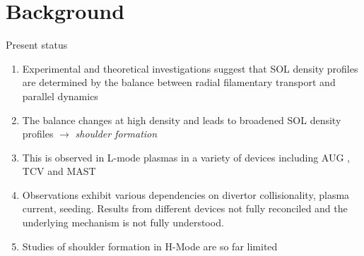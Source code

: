 \documentclass[10pt, compress, draft]{beamer}
\begin{document}
\section{Background}
\begin{frame}{Present status}
  \begin{enumerate}[<+(1) | invisible@-+>]
    \item Experimental and theoretical investigations suggest that SOL density profiles are  determined by the balance between radial filamentary transport and parallel dynamics
    \item The balance changes at high density and leads to broadened SOL density profiles $\rightarrow$ \emph{shoulder formation}
    \item This is observed in L-mode plasmas in a variety of devices including AUG \parencite{Carralero:2014gs},
      TCV \parencite{Garcia:2007p2615} and MAST \parencite{Militello:2016hk}
    \item Observations exhibit various dependencies on divertor
      collisionality, plasma current,  seeding. \alert{Results from
        different devices not fully reconciled and the underlying mechanism is not fully understood.}
    \item Studies of shoulder formation in H-Mode are so far limited 
    \end{enumerate}
\end{frame}
\end{document}
